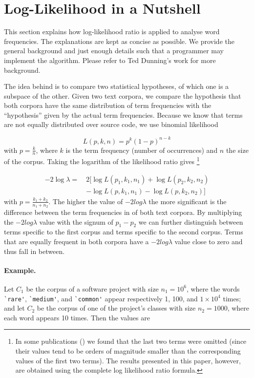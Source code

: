 \documentclass[10pt]{book}
\begin{document}
\section{Log-Likelihood in a Nutshell}\label{nutshell}

This section explains how log-likelihood ratio is applied to analyse word frequencies. The explanations are kept as concise as possible. We provide the general background and just enough details such that a programmer may implement the algorithm. Please refer to Ted Dunning's work \cite{Dunning} for more background.

The idea behind \loglr is to compare two statistical hypotheses, of which one is a subspace of the other. Given two text corpora, we compare the hypothesis that both corpora have the same distribution of term frequencies with the ``hypothesis'' given by the actual term frequencies. Because we know that terms are not equally distributed over source code, we use binomial likelihood

$$ L(p,k,n) = p^k ( 1 - p) ^ { n - k }$$
\noindent
with $p = \frac{k}{n}$, where $k$ is the term frequency (\ie number of occurrences) and $n$ the size of the corpus. Taking the logarithm of the likelihood ratio gives
\footnote{In some publications (\eg \cite{Rayson}) we found that the last two terms were omitted (since their values tend to be orders of magnitude smaller than the corresponding values of the first two terms). The results presented in this paper, however, are obtained using the complete log likelihood ratio formula.}

\begin{align*}
-2 \log \lambda =~&2 \big[ \log L(p_1,k_1,n_1) + \log L(p_2,k_2,n_2)\\
 &- \log L(p,k_1,n_1) - \log L(p,k_2,n_2) \big] 
\end{align*}
\noindent
with $p = \frac{k_1 + k_2}{n_1 + n_2}$. The higher the value of $-2log\lambda$ the more significant is the difference between the term frequencies in of both text corpora. By multiplying the $-2log\lambda$ value with the signum of $p_1 - p_2$ we can further distinguish between terms specific to the first corpus and terms specific to the second corpus. Terms that are equally frequent in both corpora have a $-2log\lambda$ value close to zero and thus fall in between.

\paragraph{Example.} Let $C_1$ be the corpus of a software project with size $n_1 = 10^6$, where the words \verb$`rare'$, \verb$`medium'$, and \verb$`common'$ appear respectively 1, 100, and $1\times10^4$ times; and let $C_2$ be the corpus of one of the project's classes with size $n_2 = 1000$, where each word appears 10 times. Then the \loglr{} values are
\end{document}
